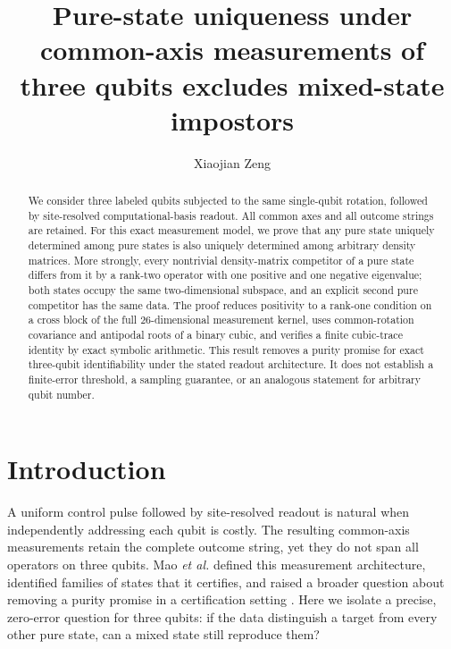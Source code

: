 \documentclass[aps,pra,reprint,onecolumn,superscriptaddress]{revtex4-2}
\begin{document}
\title{Pure-state uniqueness under common-axis measurements of three qubits excludes mixed-state impostors}

\author{Xiaojian Zeng}

\begin{abstract}
We consider three labeled qubits subjected to the same single-qubit rotation, followed by site-resolved computational-basis readout. All common axes and all outcome strings are retained. For this exact measurement model, we prove that any pure state uniquely determined among pure states is also uniquely determined among arbitrary density matrices. More strongly, every nontrivial density-matrix competitor of a pure state differs from it by a rank-two operator with one positive and one negative eigenvalue; both states occupy the same two-dimensional subspace, and an explicit second pure competitor has the same data. The proof reduces positivity to a rank-one condition on a cross block of the full 26-dimensional measurement kernel, uses common-rotation covariance and antipodal roots of a binary cubic, and verifies a finite cubic-trace identity by exact symbolic arithmetic. This result removes a purity promise for exact three-qubit identifiability under the stated readout architecture. It does not establish a finite-error threshold, a sampling guarantee, or an analogous statement for arbitrary qubit number.
\end{abstract}

\maketitle

\section{Introduction}

A uniform control pulse followed by site-resolved readout is natural when independently addressing each qubit is costly. The resulting common-axis measurements retain the complete outcome string, yet they do not span all operators on three qubits. Mao \emph{et al.} defined this measurement architecture, identified families of states that it certifies, and raised a broader question about removing a purity promise in a certification setting \cite{Mao2026}. Here we isolate a precise, zero-error question for three qubits: if the data distinguish a target from every other pure state, can a mixed state still reproduce them?
\end{document}
